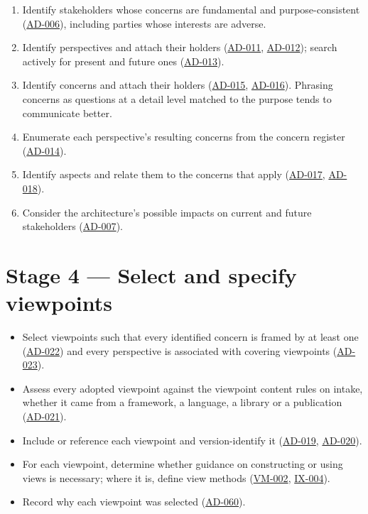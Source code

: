 \documentclass[11pt,a4paper]{report}
\newcommand{\rref}[1]{\hyperref[rule:#1]{\textsf{\small #1}}}
\begin{document}
\begin{enumerate}
  \item Identify stakeholders whose concerns are fundamental and
        purpose-consistent (\rref{AD-006}), including parties
        whose interests are adverse.
  \item Identify perspectives and attach their holders
        (\rref{AD-011}, \rref{AD-012}); search
        actively for present and future ones
        (\rref{AD-013}).
  \item Identify concerns and attach their holders
        (\rref{AD-015}, \rref{AD-016}).
        Phrasing concerns as questions at a detail level matched to the purpose
        tends to communicate better.
  \item Enumerate each perspective's resulting concerns from the concern
        register (\rref{AD-014}).
  \item Identify aspects and relate them to the concerns that apply
        (\rref{AD-017}, \rref{AD-018}).
  \item Consider the architecture's possible impacts on current and future
        stakeholders (\rref{AD-007}).
\end{enumerate}

\section{Stage 4 --- Select and specify viewpoints}

\begin{itemize}
  \item Select viewpoints such that every identified concern is framed by at
        least one (\rref{AD-022}) and every perspective is
        associated with covering viewpoints
        (\rref{AD-023}).
  \item Assess every adopted viewpoint against the viewpoint content rules on
        intake, whether it came from a framework, a language, a library or a
        publication (\rref{AD-021}).
  \item Include or reference each viewpoint and version-identify it
        (\rref{AD-019}, \rref{AD-020}).
  \item For each viewpoint, determine whether guidance on constructing or using
        views is necessary; where it is, define view methods
        (\rref{VM-002}, \rref{IX-004}).
  \item Record why each viewpoint was selected
        (\rref{AD-060}).
\end{itemize}
\end{document}
